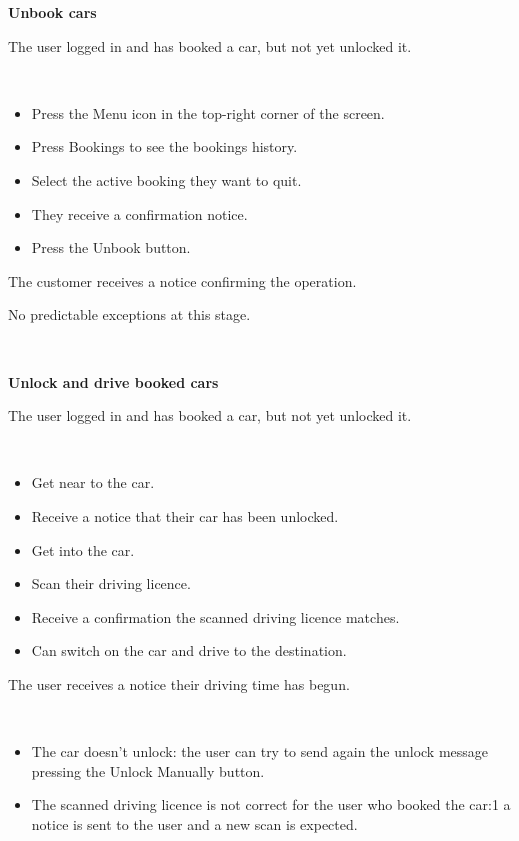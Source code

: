 \documentclass[11pt]{article} %
\begin{document}
\begin{description}[noitemsep,topsep=0pt,parsep=0pt,partopsep=0pt]
	\item[Name:] \textbf{Unbook cars}
	\item[Entry Conditions:] The user logged in and has booked a car, but not yet unlocked it.
	\item[Flow Of Events:] \hfill\
	\begin{itemize}
		\item Press the Menu icon in the top-right corner of the screen.
		\item Press Bookings to see the bookings history.
		\item Select the active booking they want to quit.
		\item They receive a confirmation notice.
		\item Press the Unbook button.
	\end{itemize}
	\item[Exit conditions:] The customer receives a notice confirming the operation.
	\item[Exceptions:] No predictable exceptions at this stage.
\end{description}
\hfill\

\begin{description}[noitemsep,topsep=0pt,parsep=0pt,partopsep=0pt]
	\item[Name:] \textbf{Unlock and drive booked cars}
	\item[Entry Conditions:] The user logged in and has booked a car, but not yet unlocked it.
	\item[Flow Of Events:] \hfill\
	\begin{itemize}
		\item Get near to the car.
		\item Receive a notice that their car has been unlocked.
		\item Get into the car.
		\item Scan their driving licence.
		\item Receive a confirmation the scanned driving licence matches.
		\item Can switch on the car and drive to the destination.
	\end{itemize}
	\item[Exit conditions:]  The user receives a notice their driving time has begun.
	\item[Exceptions:] \hfill\
	\begin{itemize}
		\item The car doesn't unlock: the user can try to send again the unlock message pressing the Unlock Manually button.
		\item The scanned driving licence is not correct for the user who booked the car:1 a notice is sent to the user and a new scan is expected.
	\end{itemize}
\end{description}
\hfill\
\end{document}
